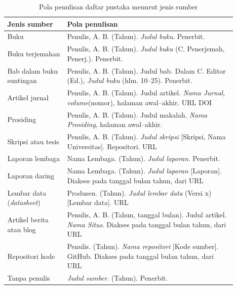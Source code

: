 \begin{singlespace}
\begin{longtable}{|p{0.24\linewidth}|p{0.68\linewidth}|}
\caption{Pola penulisan daftar pustaka menurut jenis sumber}\\
\hline
\textbf{Jenis sumber} & \textbf{Pola penulisan} \\
\hline
Buku & Penulis, A. B. (Tahun). \textit{Judul buku}. Penerbit. \\
\hline
Buku terjemahan & Penulis, A. B. (Tahun). \textit{Judul buku} (C. Penerjemah, Penerj.). Penerbit. \\
\hline
Bab dalam buku suntingan & Penulis, A. B. (Tahun). Judul bab. Dalam C. Editor (Ed.), \textit{Judul buku} (hlm. 10--25). Penerbit. \\
\hline
Artikel jurnal & Penulis, A. B. (Tahun). Judul artikel. \textit{Nama Jurnal, volume}(nomor), halaman awal--akhir. URL DOI \\
\hline
Prosiding & Penulis, A. B. (Tahun). Judul makalah. \textit{Nama Prosiding}, halaman awal--akhir. \\
\hline
Skripsi atau tesis & Penulis, A. B. (Tahun). \textit{Judul skripsi} [Skripsi, Nama Universitas]. Repositori. URL \\
\hline
Laporan lembaga & Nama Lembaga. (Tahun). \textit{Judul laporan}. Penerbit. \\
\hline
Laporan daring & Nama Lembaga. (Tahun). \textit{Judul laporan} [Laporan]. Diakses pada tanggal bulan tahun, dari URL \\
\hline
Lembar data (\textit{datasheet}) & Produsen. (Tahun). \textit{Judul lembar data} (Versi x) [Lembar data]. URL \\
\hline
Artikel berita atau blog & Penulis, A. B. (Tahun, tanggal bulan). Judul artikel. \textit{Nama Situs}. Diakses pada tanggal bulan tahun, dari URL \\
\hline
Repositori kode & Penulis. (Tahun). \textit{Nama repositori} [Kode sumber]. GitHub. Diakses pada tanggal bulan tahun, dari URL \\
\hline
Tanpa penulis & \textit{Judul sumber}. (Tahun). Penerbit. \\
\hline
\end{longtable}
\end{singlespace}

